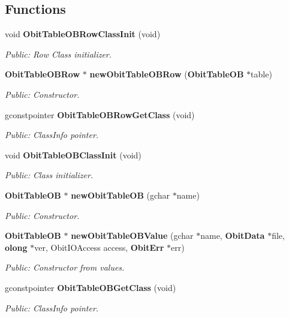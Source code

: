 \subsection*{Functions}
\begin{CompactItemize}
\item 
void {\bf Obit\-Table\-OBRow\-Class\-Init} (void)
\begin{CompactList}\small\item\em Public: Row Class initializer. \item\end{CompactList}\item 
{\bf Obit\-Table\-OBRow} $\ast$ {\bf new\-Obit\-Table\-OBRow} ({\bf Obit\-Table\-OB} $\ast$table)
\begin{CompactList}\small\item\em Public: Constructor. \item\end{CompactList}\item 
gconstpointer {\bf Obit\-Table\-OBRow\-Get\-Class} (void)
\begin{CompactList}\small\item\em Public: Class\-Info pointer. \item\end{CompactList}\item 
void {\bf Obit\-Table\-OBClass\-Init} (void)
\begin{CompactList}\small\item\em Public: Class initializer. \item\end{CompactList}\item 
{\bf Obit\-Table\-OB} $\ast$ {\bf new\-Obit\-Table\-OB} (gchar $\ast$name)
\begin{CompactList}\small\item\em Public: Constructor. \item\end{CompactList}\item 
{\bf Obit\-Table\-OB} $\ast$ {\bf new\-Obit\-Table\-OBValue} (gchar $\ast$name, {\bf Obit\-Data} $\ast$file, {\bf olong} $\ast$ver, Obit\-IOAccess access, {\bf Obit\-Err} $\ast$err)
\begin{CompactList}\small\item\em Public: Constructor from values. \item\end{CompactList}\item 
gconstpointer {\bf Obit\-Table\-OBGet\-Class} (void)
\begin{CompactList}\small\item\em Public: Class\-Info pointer. \item\end{CompactList}\item 

\end{CompactItemize}
